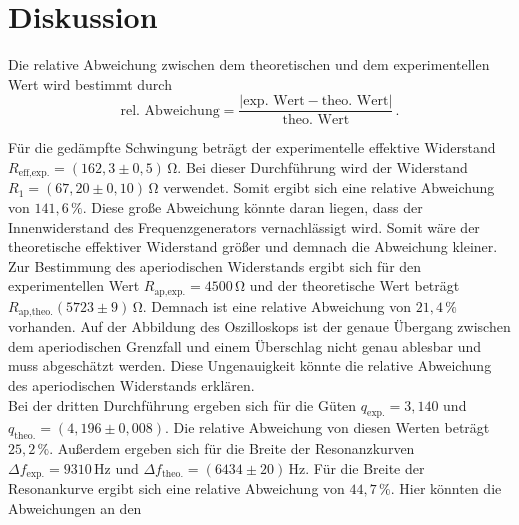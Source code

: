 \section{Diskussion}
\label{sec:Diskussion}
Die relative Abweichung zwischen dem theoretischen und dem experimentellen Wert wird bestimmt durch
$$\text{rel. Abweichung} = \frac{|\text{exp. Wert} - \text{theo. Wert}|}{\text{theo. Wert}}\,.$$

Für die gedämpfte Schwingung beträgt der experimentelle effektive Widerstand $R_{\text{eff,exp.}} = \left(162,3 \pm 0,5\right)\,\unit{\ohm}$.
Bei dieser Durchführung wird der Widerstand $R_1 = \left(67,20 \pm 0,10\right)\,\unit{\ohm}$ verwendet. Somit ergibt sich eine relative Abweichung 
von $141,6\,\%$. Diese große Abweichung könnte daran liegen, dass der Innenwiderstand des Frequenzgenerators vernachlässigt wird. Somit wäre 
der theoretische effektiver Widerstand größer und demnach die Abweichung kleiner.\\
Zur Bestimmung des aperiodischen Widerstands ergibt sich für den experimentellen Wert $R_{\text{ap,exp.}} = 4500 \,\unit{\ohm}$ und der theoretische
Wert beträgt $R_{\text{ap,theo.}}\left(5723\pm9\right)\,\unit{\ohm}$. Demnach ist eine relative Abweichung von $21,4\,\%$ vorhanden. Auf der Abbildung des Oszilloskops
ist der genaue Übergang zwischen dem aperiodischen Grenzfall und einem Überschlag nicht genau ablesbar und muss abgeschätzt werden. Diese Ungenauigkeit könnte die relative Abweichung 
des aperiodischen Widerstands erklären.\\
Bei der dritten Durchführung ergeben sich für die Güten $q_{\text{exp.}} = 3,140 $ und $q_{\text{theo.}} =\left(4,196\pm0,008\right)$. Die relative Abweichung
von diesen Werten beträgt $25,2\,\%$. Außerdem ergeben sich für die Breite der Resonanzkurven $\Delta f_{\text{exp.}} =9310\,\unit{\hertz}$ und
$\Delta f_{\text{theo.}} =\left(6434\pm20\right)\,\unit{\hertz}$. Für die Breite der Resonankurve ergibt sich eine relative Abweichung von $44,7\,\%$.
Hier könnten die Abweichungen an den 
